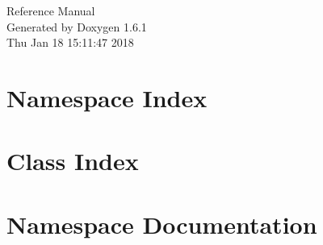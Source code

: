 \documentclass[a4paper]{book}
\begin{document}
\hypersetup{pageanchor=false}
\begin{titlepage}
\vspace*{7cm}
\begin{center}
{\Large Reference Manual}\\
\vspace*{1cm}
{\large Generated by Doxygen 1.6.1}\\
\vspace*{0.5cm}
{\small Thu Jan 18 15:11:47 2018}\\
\end{center}
\end{titlepage}
\clearemptydoublepage
{}
\tableofcontents
\clearemptydoublepage
{}
\hypersetup{pageanchor=true}
\chapter{Namespace Index}

\chapter{Class Index}

\chapter{Namespace Documentation}

\end{document}
